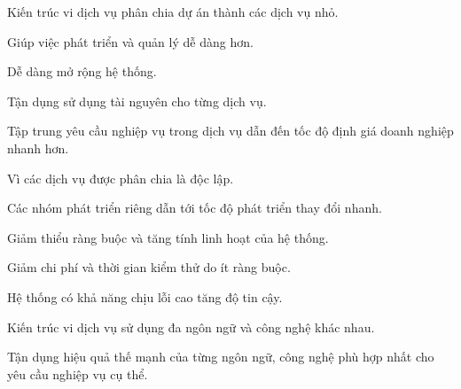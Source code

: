Kiến trúc vi dịch vụ phân chia dự án thành các dịch vụ nhỏ.

Giúp việc phát triển và quản lý dễ dàng hơn.

Dễ dàng mở rộng hệ thống.

Tận dụng sử dụng tài nguyên cho từng dịch vụ.

Tập trung yêu cầu nghiệp vụ trong dịch vụ dẫn đến tốc độ định giá doanh nghiệp nhanh hơn.

Vì các dịch vụ được phân chia là độc lập.



Các nhóm phát triển riêng dẫn tới tốc độ phát triển thay đổi nhanh.

Giảm thiểu ràng buộc và tăng tính linh hoạt của hệ thống.

Giảm chi phí và thời gian kiểm thử do ít ràng buộc.

Hệ thống có khả năng chịu lỗi cao tăng độ tin cậy.

Kiến trúc vi dịch vụ sử dụng đa ngôn ngữ và công nghệ khác nhau.

Tận dụng hiệu quả thế mạnh của từng ngôn ngữ, công nghệ phù hợp nhất cho yêu cầu nghiệp vụ cụ thể.








